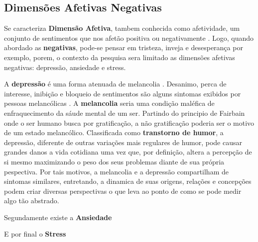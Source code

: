 \subsection{Dimensões Afetivas Negativas}
Se caracteriza \textbf{Dimensão Afetiva}, tambem conhecida como afetividade, um conjunto de sentimentos que nos afetão positiva ou negativamente \cite{pinto2009afetos}. Logo, quando abordado as \textbf{negativas}, pode-se pensar em tristeza, inveja e desesperança por exemplo, porem, o contexto da pesquisa sera limitado as dimensões afetivas negativas: depressão, ansiedade e stress.

A \textbf{depressão} é uma forma atenuada de melancolia \cite{roudinesco2000}. Desanimo, perca de interesse, inibição e bloqueio de sentimentos são alguns sintomas exibidos por pessoas melancólicas \cite[276]{freud}. A \textbf{melancolia} seria uma condição maléfica de enfraquecimento da sáude mental de um ser. Partindo do principio de Fairbain onde o ser humano busca por gratificação, a não gratificação poderia ser o motivo de um estado melancólico. Classificada como \textbf{transtorno de humor}, a depressão, diferente de outras variações mais regulares de humor, pode causar grandes danos a vida cotidiana uma vez que, por definição, altera a percepção de si mesmo maximizando o peso dos seus problemas diante de sua própria pespectiva. Por tais motivos, a melancolia e a depressão compartilham de sintomas similares, entretando, a dinamica de suas origens, relações e concepções podem criar diversas perspectivas o que leva ao ponto de como se pode medir algo tão abstrado. \cite{}

Segundamente existe a \textbf{Ansiedade}

E por final o \textbf{Stress}
